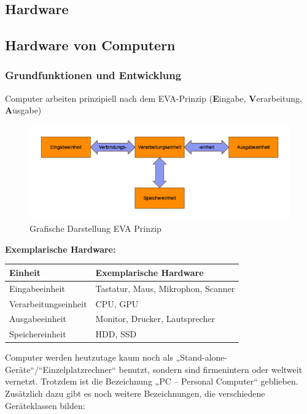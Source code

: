 \documentclass[10pt]{article}
\begin{document}
\begin{flushleft}

\section{Hardware}
\subsection{Hardware von Computern}

\subsubsection{Grundfunktionen und Entwicklung}

Computer arbeiten prinzipiell nach dem EVA-Prinzip (\textbf{E}ingabe, \textbf{V}erarbeitung, \textbf{A}usgabe)

\begin{figure}[H]
\begin{center}
  \includegraphics[width=1\textwidth]{EVA-Prinzip.png}
  \end{center}
  \caption{Grafische Darstellung EVA Prinzip}
\end{figure}

\textbf{Exemplarische Hardware:}

\begin{table}[H]
    \centering
    \begin{tabular}{l|l}
        Einheit & Exemplarische Hardware \\\hline
        Eingabeeinheit & Tastatur, Maus, Mikrophon, Scanner \\
        Verarbeitungseinheit & CPU, GPU \\
        Ausgabeeinheit & Monitor, Drucker, Lautsprecher \\
        Speichereinheit & HDD, SSD
    \end{tabular}
\end{table}

Computer werden heutzutage kaum noch als „Stand-alone-Geräte“/“Einzelplatzrechner“ benutzt, sondern sind firmenintern oder weltweit vernetzt. Trotzdem ist die Bezeichnung „PC – Personal Computer“ geblieben. Zusätzlich dazu gibt es noch weitere Bezeichnungen, die verschiedene Geräteklassen bilden:


\end{flushleft}
\end{document}
